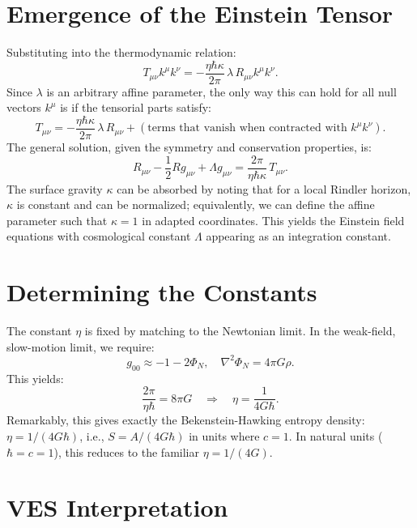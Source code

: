 \documentclass[12pt,a4paper]{book}
\begin{document}
\section{Emergence of the Einstein Tensor}

Substituting into the thermodynamic relation:
\begin{equation}
    T_{\mu\nu} k^\mu k^\nu = -\frac{\eta \hbar \kappa}{2\pi} \, \lambda \, R_{\mu\nu} k^\mu k^\nu.
\end{equation}
Since $\lambda$ is an arbitrary affine parameter, the only way this can hold for all null vectors $k^\mu$ is if the tensorial parts satisfy:
\begin{equation}
    T_{\mu\nu} = -\frac{\eta \hbar \kappa}{2\pi} \, \lambda \, R_{\mu\nu} + (\text{terms that vanish when contracted with } k^\mu k^\nu).
\end{equation}
The general solution, given the symmetry and conservation properties, is:
\begin{equation}
    R_{\mu\nu} - \frac12 R g_{\mu\nu} + \Lambda g_{\mu\nu} = \frac{2\pi}{\eta \hbar \kappa} \, T_{\mu\nu}.
\end{equation}
The surface gravity $\kappa$ can be absorbed by noting that for a local Rindler horizon, $\kappa$ is constant and can be normalized; equivalently, we can define the affine parameter such that $\kappa = 1$ in adapted coordinates. This yields the Einstein field equations with cosmological constant $\Lambda$ appearing as an integration constant.

\section{Determining the Constants}

The constant $\eta$ is fixed by matching to the Newtonian limit. In the weak-field, slow-motion limit, we require:
\begin{equation}
    g_{00} \approx -1 - 2\Phi_N, \quad \nabla^2 \Phi_N = 4\pi G \rho.
\end{equation}
This yields:
\begin{equation}
    \frac{2\pi}{\eta \hbar} = 8\pi G \quad \Rightarrow \quad \eta = \frac{1}{4G\hbar}.
\end{equation}
Remarkably, this gives exactly the Bekenstein-Hawking entropy density: $\eta = 1/(4G\hbar)$, i.e., $S = A/(4G\hbar)$ in units where $c=1$. In natural units ($\hbar=c=1$), this reduces to the familiar $\eta = 1/(4G)$.

\section{VES Interpretation}
\end{document}

